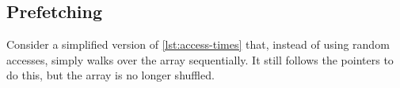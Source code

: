 \subsection{Prefetching}
\label{sec:prefetch}

Consider
a simplified version of \cref{lst:access-times} that, instead of using random accesses,
simply walks over the array sequentially.  It still follows the pointers to do this, but
the array is no longer shuffled.



